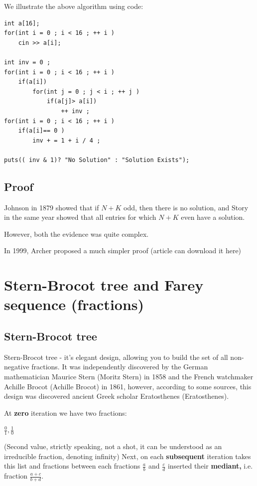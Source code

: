 We illustrate the above algorithm using code: \begin{verbatim}
int a[16];
for(int i = 0 ; i < 16 ; ++ i )
    cin >> a[i];
 
int inv = 0 ;
for(int i = 0 ; i < 16 ; ++ i )
    if(a[i])
        for(int j = 0 ; j < i ; ++ j )
            if(a[j]> a[i])
                ++ inv ;
for(int i = 0 ; i < 16 ; ++ i )
    if(a[i]== 0 )
        inv + = 1 + i / 4 ;
 
puts(( inv & 1)? "No Solution" : "Solution Exists"); 
\end{verbatim}

\subsection{ Proof }

Johnson in 1879 showed that if $N + K$ odd, then there is no solution, and Story in the same year showed that all entries for which $N + K$ even have a solution.

However, both the evidence was quite complex.

In 1999, Archer proposed a much simpler proof (article can download it here)

\section{ Stern-Brocot tree and Farey sequence (fractions) }
\subsection{ Stern-Brocot tree }

Stern-Brocot tree - it's elegant design, allowing you to build the set of all non-negative fractions. It was independently discovered by the German mathematician Maurice Stern (Moritz Stern) in 1858 and the French watchmaker Achille Brocot (Achille Brocot) in 1861, however, according to some sources, this design was discovered ancient Greek scholar Eratosthenes (Eratosthenes).

At \textbf{zero} iteration we have two fractions:

$\frac {0} {1}, \frac {1} {0}$

(Second value, strictly speaking, not a shot, it can be understood as an irreducible fraction, denoting infinity)
Next, on each \textbf{subsequent} iteration takes this list and fractions between each fractions $\frac {a} {b}$ and $\frac {c} {d}$ inserted their \textbf{mediant,} i.e. fraction $\frac {a + c} {b + d}$.


